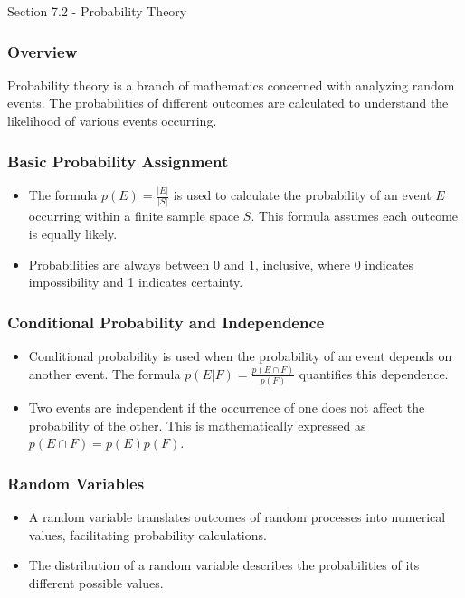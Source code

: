 \begin{notes}{Section 7.2 - Probability Theory}
    \subsubsection*{Overview}
    Probability theory is a branch of mathematics concerned with analyzing random events. The probabilities of different outcomes are calculated to understand the likelihood of various events occurring. \vspace*{1em}

    \subsubsection*{Basic Probability Assignment}
    \begin{itemize}
        \item The formula $p(E) = \frac{|E|}{|S|}$ is used to calculate the probability of an event $E$ occurring within a finite sample space $S$. This formula assumes each outcome is 
        equally likely.
        \item Probabilities are always between 0 and 1, inclusive, where 0 indicates impossibility and 1 indicates certainty.
    \end{itemize}

    \subsubsection*{Conditional Probability and Independence}
    \begin{itemize}
        \item Conditional probability is used when the probability of an event depends on another event. The formula $p(E | F) = \frac{p(E \cap F)}{p(F)}$ quantifies this dependence.
        \item Two events are independent if the occurrence of one does not affect the probability of the other. This is mathematically expressed as $p(E \cap F) = p(E)p(F)$.
    \end{itemize}

    \subsubsection*{Random Variables}
    \begin{itemize}
        \item A random variable translates outcomes of random processes into numerical values, facilitating probability calculations.
        \item The distribution of a random variable describes the probabilities of its different possible values.
    \end{itemize}


\end{notes}
